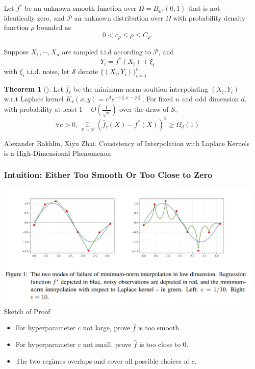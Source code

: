 \documentclass{beamer}   	%
\theoremstyle{definition}
\newtheorem*{thm}{Theorem}
\begin{document}
\begin{frame}
	Let $f^*$ be an unknown smooth function over $\Omega=\overline{B_{\mathbb{R}^d}(0,1)}$ that is not identically zero, and $\mathcal{P}$ an unknown distribution over $\Omega$ with probability density function $\rho$ bounded as
	\begin{equation}
		0< c_ \rho\le \rho\le C_ \rho.
	\end{equation}

	Suppose $X_1,\cdots,X_n$ are sampled i.i.d according to $\mathcal{P}$, and
	\begin{equation}
		Y_i=f^*(X_i)+\xi_i
	\end{equation}
	with $\xi_i$ i.i.d. noise, let $\mathcal{S}$ denote $\{(X_i,Y_i)\}_{i=1}^n$

	\begin{thm}[\cite{cint}]
		Let $\hat{f}_c$ be the minimum-norm soultion interpolating $(X_i,Y_i)$ w.r.t Laplace kernel $K_c(x,y)= c^d e^{-c\|x-y\|}$. For fixed $n$ and odd dimension $d$, with probability at least $1-O(\frac{1}{\sqrt{n}})$ over the draw of $S$,
		\begin{equation}
			\forall c> 0,\mathop{\mathbb{E}}\limits_{X\sim \mathcal{P}}\left(
			\hat{f}_c(X)-f^*(X)\right)^2\ge \Omega_d(1)
		\end{equation}
	\end{thm}
\begin{thebibliography}{9}
\scriptsize
{}

Alexander Rakhlin, Xiyu Zhai. Consistency of Interpolation with Laplace Kernels is a High-Dimensional Phenomenon
\end{thebibliography}
\end{frame}

\begin{frame}
\frametitle{Intuition: Either Too Smooth Or Too Close to Zero}
\includegraphics[width=\linewidth]{int_intuition.png}
Sketch of Proof
\begin{itemize}
	\item For hyperparameter $c$ not large, prove $\hat{f}$ is too smooth.
	\item For hyperparameter $c$ not small, prove $\hat{f}$ is too close to $0$.
	\item The two regimes overlaps and cover all possible choices of $c$.
\end{itemize}
\end{frame}
\end{document}

